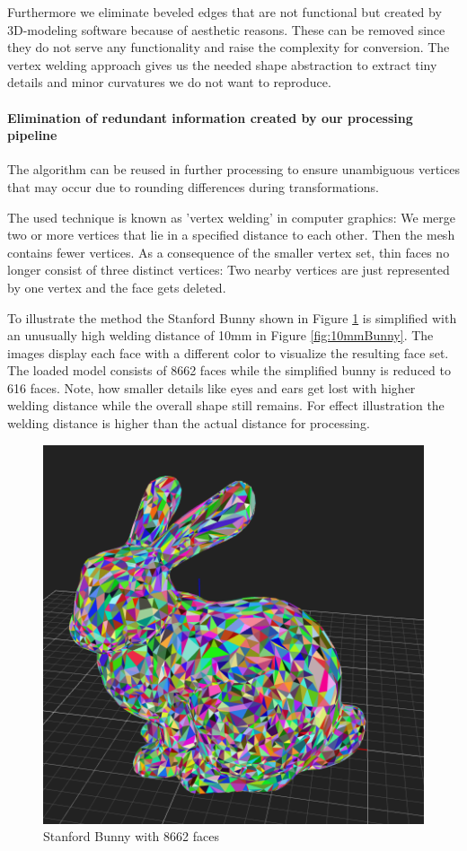 \documentclass[../ClassicThesis.tex]{subfiles}
\begin{document}
Furthermore we eliminate beveled edges that are not functional but created by 3D-modeling software because of aesthetic reasons. These can be removed since they do not serve any functionality and raise the complexity for conversion. The vertex welding approach gives us the needed shape abstraction to extract tiny details and minor curvatures we do not want to reproduce.

\paragraph*{Elimination of redundant information created by our processing pipeline}

The algorithm can be reused in further processing to ensure unambiguous vertices that may occur due to rounding differences during transformations.


The used technique is known as 'vertex welding' in computer graphics: We merge two or more vertices that lie in a specified distance to each other. Then the mesh contains fewer vertices. As a consequence of the smaller vertex set, thin faces no longer consist of three distinct vertices: Two nearby vertices are just represented by one vertex and the face gets deleted.

To illustrate the method the {\threedmodel} Stanford Bunny shown in Figure \ref{fig:origBunny} is simplified with an unusually high welding distance of 10mm in Figure \ref{fig:10mmBunny}. The images display each face with a different color to visualize the resulting face set. The loaded model consists of 8662 faces while the simplified bunny is reduced to 616 faces. Note, how smaller details like eyes and ears get lost with higher welding distance while the overall shape still remains. For effect illustration the welding distance is higher than the actual distance for processing.

\begin{figure}
\includegraphics[width=0.8\columnwidth]{Images/04-approx-welding-rabbit-original.png}
\caption{Stanford Bunny with 8662 faces}
\label{fig:origBunny}
\end{figure}
\end{document}
